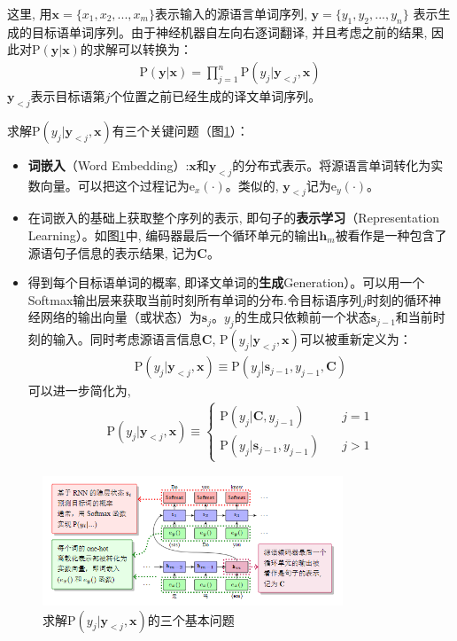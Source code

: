 \documentclass[a4paper]{article}
\newcommand{\parinterval}{\noindent\hspace{2em}}%
\begin{document}
\noindent 这里, 用$\mathbf{x}=\{ x_1, x_2, ...,  x_m \}$表示输入的源语言单词序列, $\mathbf{y}=\{ y_1, y_2, ...,  y_n \}$ 表示生成的目标语单词序列。由于神经机器自左向右逐词翻译, 并且考虑之前的结果, 因此对$\textrm{P} (\mathbf{y} | \mathbf{x})$的求解可以转换为：
\begin{eqnarray}
\textrm{P} (\mathbf{y} | \mathbf{x}) = \prod_{j=1}^{n} \textrm{P} ( y_j | \mathbf{y}_{<j },  \mathbf{x}  )
\end{eqnarray}
$ \mathbf{y}_{<j }$表示目标语第$j$个位置之前已经生成的译文单词序列。

\parinterval 求解$\textrm{P}(y_j | \mathbf{y}_{<j}, \mathbf{x})$有三个关键问题（图\ref{fig:probquestion}）：

\begin{itemize}
\item	{\small\sffamily\bfseries{词嵌入}}（Word Embedding）:$\mathbf{x}$和$\mathbf{y}_{<j }$的分布式表示。将源语言单词转化为实数向量。可以把这个过程记为$\textrm{e}_x (\cdot)$。类似的, $\mathbf{y}_{<j }$记为$\textrm{e}_y (\cdot)$。
\item	在词嵌入的基础上获取整个序列的表示, 即句子的{\small\sffamily\bfseries{表示学习}}（Representation Learning）。如图\ref{fig:probquestion}中, 编码器最后一个循环单元的输出$\mathbf{h}_m$被看作是一种包含了源语句子信息的表示结果, 记为$\mathbf{C}$。
\item	得到每个目标语单词的概率, 即译文单词的{\small\sffamily\bfseries{生成}}Generation）。可以用一个Softmax输出层来获取当前时刻所有单词的分布.令目标语序列$j$时刻的循环神经网络的输出向量（或状态）为$\mathbf{s}_j$。$ y_j$的生成只依赖前一个状态$\mathbf{s}_{j-1}$和当前时刻的输入。同时考虑源语言信息$\mathbf{C}$, $\textrm{P}(y_j  | \mathbf{y}_{<j}, \mathbf{x})$可以被重新定义为：
\begin{eqnarray}
\textrm{P} (y_j | \mathbf{y}_{<j}, \mathbf{x}) \equiv \textrm{P} ( {y_j | \mathbf{s}_{j-1} , y_{j-1}, \mathbf{C}} )
\end{eqnarray}
可以进一步简化为, 
\begin{eqnarray}
\textrm{P} (y_j | \mathbf{y}_{<j}, \mathbf{x}) \equiv
 \left \{ \begin{array}{ll}
\textrm{P} (y_j |\mathbf{C} , y_{j-1}) &j=1 \\
\textrm{P} (y_j|\mathbf{s}_{j-1}, y_{j-1})  \quad &j>1
\end{array} \right . 
\end{eqnarray}
\end{itemize}

\begin{figure}[htp]
    \centering
     \includegraphics[width=0.8\textwidth]{RNNprobquestion.png}
    \caption{求解$\textrm{P} (y_j | \mathbf{y}_{<j}, \mathbf{x})$的三个基本问题}
    \label{fig:probquestion}
    \end{figure}
\end{document}
